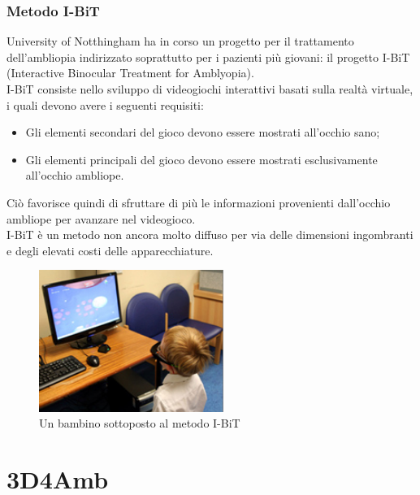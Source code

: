 \documentclass[12pt,a4paper,openright,twoside]{book}
\begin{document}
    \subsection{Metodo I-BiT}
    University of Notthingham ha in corso un progetto per il trattamento dell'ambliopia indirizzato soprattutto per i pazienti più giovani: il progetto I-BiT (Interactive Binocular Treatment for Amblyopia).\\
    I-BiT consiste nello sviluppo di videogiochi interattivi basati sulla realtà virtuale, i quali devono avere i seguenti requisiti: 
    \begin{itemize}
    	\item Gli elementi secondari del gioco devono essere mostrati all'occhio sano;
    	\item Gli elementi principali del gioco devono essere mostrati esclusivamente all'occhio ambliope.
    \end{itemize}
	Ciò favorisce quindi di sfruttare di più le informazioni provenienti dall'occhio ambliope per avanzare nel videogioco.\\
	I-BiT è un metodo non ancora molto diffuso per via delle dimensioni ingombranti e degli elevati costi delle apparecchiature.
     \begin{figure}[h]
    	\centering   	
    	\includegraphics[width=60mm]{i-bit.jpg}
    	\caption{Un bambino sottoposto al metodo I-BiT}
    	\label{fig:ibit}
    \end{figure}
\newpage
\thispagestyle{empty}
    \chapter{3D4Amb}
\end{document}
